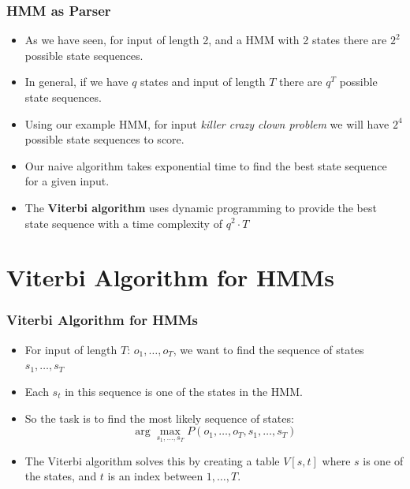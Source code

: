 \begin{frame}
\frametitle{HMM as Parser}
\begin{itemize}[<+->]
\item As we have seen, for input of length 2, and a HMM with 2 states there are $2^2$ possible state sequences.
\item In general, if we have $q$ states and input of length $T$ there are $q^T$ possible state sequences.
\item Using our example HMM, for input {\it killer crazy clown problem} we will have $2^4$ possible state sequences to score.
\item Our naive algorithm takes exponential time to find the best state sequence for a given input.
\item The {\bf Viterbi algorithm} uses dynamic programming to provide the best state sequence with a time complexity of $q^2 \cdot T$
\end{itemize}
\end{frame}

\section{Viterbi Algorithm for HMMs}

\begin{frame}
\frametitle{Viterbi Algorithm for HMMs}
\begin{itemize}[<+->]
\item For input of length $T$: $o_1, \ldots, o_T$, we want to find the sequence of states $s_1, \ldots, s_T$
\item Each $s_t$ in this sequence is one of the states in the HMM.
\item So the task is to find the most likely sequence of states:
\[ \arg\max_{s_1, \ldots, s_T} P(o_1, \ldots, o_T, s_1, \ldots, s_T) \]
\item The Viterbi algorithm solves this by creating a table $V[s,t]$ where $s$ is one of the states, and $t$ is an index between $1, \ldots, T$.
\end{itemize}
\end{frame}

